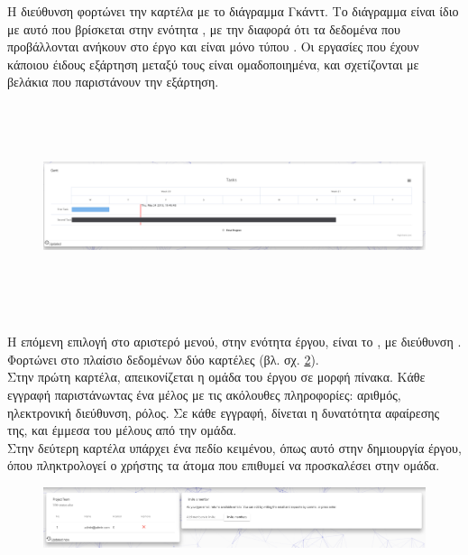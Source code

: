 \pagebreak

\subsubsection*{}
\pSpace Η διεύθυνση  φορτώνει την καρτέλα με το διάγραμμα Γκάνττ. Το διάγραμμα είναι ίδιο με αυτό που βρίσκεται στην ενότητα , με την διαφορά ότι τα δεδομένα που προβάλλονται ανήκουν στο έργο και είναι μόνο τύπου . Οι εργασίες που έχουν κάποιου έιδους εξάρτηση μεταξύ τους είναι ομαδοποιημένα, και σχετίζονται με βελάκια που παριστάνουν την εξάρτηση.

\begin{figure}[!htb]
\includegraphics[width=\linewidth, height=6cm]{images/projectGantt.png}
\caption{}
\label{fig:projectGantt}
\end{figure}

\subsubsection*{}
\pSpace Η επόμενη επιλογή στο αριστερό μενού, στην ενότητα έργου, είναι το , με διεύθυνση . Φορτώνει στο πλαίσιο δεδομένων δύο καρτέλες (βλ. σχ. \ref{fig:projectTeam}).\\
\pSpace Στην πρώτη καρτέλα, απεικονίζεται η ομάδα του έργου σε μορφή πίνακα. Κάθε εγγραφή παριστάνωντας ένα μέλος με τις ακόλουθες πληροφορίες: αριθμός, ηλεκτρονική διεύθυνση, ρόλος. Σε κάθε εγγραφή, δίνεται η δυνατότητα αφαίρεσης της, και έμμεσα του μέλους από την ομάδα.\\
\pSpace Στην δεύτερη καρτέλα υπάρχει ένα πεδίο κειμένου, όπως αυτό στην δημιουργία έργου, όπου πληκτρολογεί ο χρήστης τα άτομα που επιθυμεί να προσκαλέσει στην ομάδα.

\begin{figure}[!htb]
\includegraphics[width=\linewidth]{images/projectTeam.png}
\caption{}
\label{fig:projectTeam}
\end{figure}

